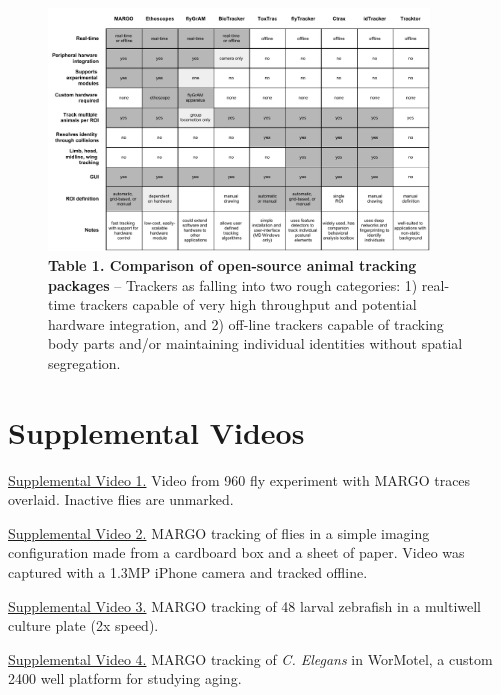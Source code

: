 \documentclass[10pt]{article}
\begin{document}
\clearpage
\begin{figure}[t!]
	\begin{center}
		\includegraphics[width=0.9\textwidth]{../figures/platform_comparison_draft.pdf}
	\end{center}
	\caption*{\footnotesize \textbf{Table 1. Comparison of open-source animal tracking packages} -- Trackers as falling into two rough categories: 1) real-time trackers capable of very high throughput and potential hardware integration, and 2) off-line trackers capable of tracking body parts and/or maintaining individual identities without spatial segregation.}
\end{figure}

\clearpage
\section*{Supplemental Videos}

\noindent
\href{https://youtu.be/fyG31BAYHE0}{Supplemental Video 1.} Video from 960 fly experiment with MARGO traces overlaid. Inactive flies are unmarked.
\newline

\noindent
\href{https://youtu.be/0aFny65wCnM}{Supplemental Video 2.} MARGO tracking of flies in a simple imaging configuration made from a cardboard box and a sheet of paper. Video was captured with a 1.3MP iPhone camera and tracked offline.
\newline

\noindent
\href{https://youtu.be/M8imxRP92k4}{Supplemental Video 3.} MARGO tracking of 48 larval zebrafish in a multiwell culture plate (2x speed).
\newline

\noindent
\href{https://youtu.be/kuTM71lHALc}{Supplemental Video 4.} MARGO tracking of \textit{C. Elegans} in WorMotel, a custom 2400 well platform for studying aging.
\newline
\end{document}
